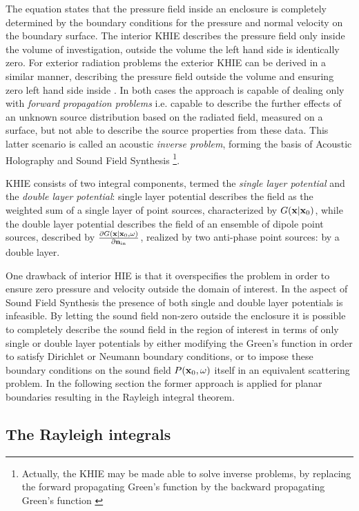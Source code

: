 The equation states that the pressure field inside an enclosure is completely determined by the boundary conditions for the pressure and normal velocity on the boundary surface.
The interior KHIE describes the pressure field only inside the volume of investigation, outside the volume the left hand side is identically zero. For exterior radiation problems the exterior KHIE can be derived in a similar manner, describing the pressure field outside the volume and ensuring zero left hand side inside \cite{Williams1999}.
In both cases the approach is capable of dealing only with \emph{forward propagation problems} i.e. capable to describe the further effects of an unknown source distribution based on the radiated field, measured on a surface, but not able to describe the source properties 	from these data. This latter scenario is called an acoustic \emph{inverse problem}, forming the basis of Acoustic Holography and Sound Field Synthesis \footnote{Actually, the KHIE may be made able to solve inverse problems, by replacing the forward propagating Green's function by the backward propagating Green's function \cite{Wapenaar1989}}.
\vspace{3mm}

KHIE consists of two integral components, termed the \emph{single layer potential} and the \emph{double layer potential}: single layer potential describes the field as the weighted sum of a single layer of point sources, characterized by $ G(\mathbf{x}|\mathbf{x}_0) $, while the double layer potential describes the field of an ensemble of dipole point sources, described by $\frac{\partial G(\mathbf{x}|\mathbf{x}_0,\omega)}{\partial \mathbf{n}_{\mathrm{in}}}$, realized by two anti-phase point sources: by a double layer.

One drawback of interior HIE is that it overspecifies the problem in order to ensure zero pressure and velocity outside the domain of interest. In the aspect of Sound Field Synthesis the presence of both single and double layer potentials is infeasible. By letting the sound field non-zero outside the enclosure it is possible to completely describe the sound field in the region of interest in terms of only single or double layer potentials by either modifying the Green's function in order to satisfy Dirichlet or Neumann boundary conditions, or to impose these boundary conditions on the sound field $ P(\mathbf{x}_0,\omega) $ itself in an equivalent scattering problem.
In the following section the former approach is applied for planar boundaries resulting in the Rayleigh integral theorem.

\subsection{The Rayleigh integrals}
\label{Section:Theory:Rayleigh}

